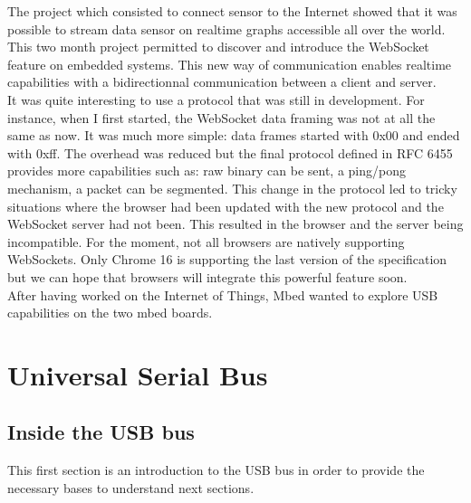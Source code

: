 \documentclass[pdftex,10pt,a4paper]{report}
\begin{document}
The project which consisted to connect sensor to the Internet showed that it was possible to stream data sensor on realtime graphs accessible all over the world. This two month project permitted to discover and introduce the WebSocket feature on embedded systems. This new way of communication enables realtime capabilities with a bidirectionnal communication between a client and server. \\

It was quite interesting to use a protocol that was still in development. For instance, when I first started, the WebSocket data framing was not at all the same as now. It was much more simple: data frames started with 0x00 and ended with 0xff. The overhead was reduced but the final protocol defined in RFC 6455 provides more capabilities such as: raw binary can be sent, a ping/pong mechanism, a packet can be segmented. This change in the protocol led to tricky situations where the browser had been updated with the new protocol and the WebSocket server had not been. This resulted in the browser and the server being incompatible. For the moment, not all browsers are natively supporting WebSockets. Only Chrome 16 is supporting the last version of the specification but we can hope that browsers will integrate this powerful feature soon.\\

After having worked on the Internet of Things, Mbed wanted to explore USB capabilities on the two mbed boards.
	
	
	
	
	
	
	
	
	
	

\chapter{Universal Serial Bus}

\section{Inside the USB bus}
This first section is an introduction to the USB bus in order to provide the necessary bases to understand next sections.
\end{document}
